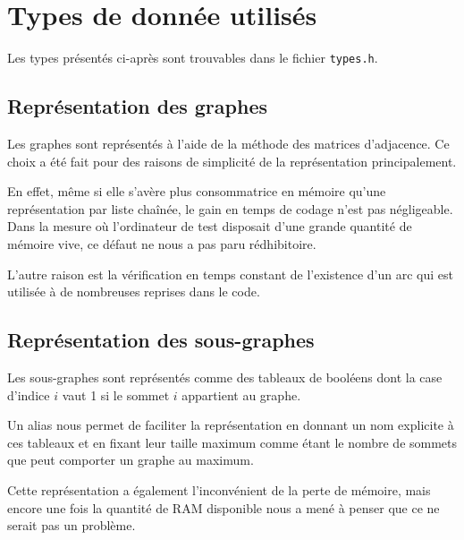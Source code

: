 \section{Types de donnée utilisés}

Les types présentés ci-après sont trouvables dans le fichier \verb|types.h|.

\subsection{Représentation des graphes}

Les graphes sont représentés à l'aide de la méthode des matrices d'adjacence. Ce choix a été fait pour des raisons de simplicité de la représentation principalement. 

En effet, même si elle s’avère  plus consommatrice en mémoire qu'une représentation par liste  chaînée, le gain en temps de codage n'est pas négligeable. Dans la mesure où l'ordinateur de test disposait d'une grande quantité de mémoire vive, ce défaut ne nous a pas paru rédhibitoire. 

L'autre raison est la vérification en temps constant de l'existence d'un arc qui est utilisée à de nombreuses reprises dans le code. 

\subsection{Représentation des sous-graphes}

Les sous-graphes sont représentés comme des tableaux de booléens dont la case d'indice $i$ vaut 1 si le sommet $i$ appartient au graphe. 

Un alias nous permet de faciliter la représentation en donnant un nom explicite à ces tableaux et en fixant leur taille maximum comme étant le nombre de sommets que peut comporter un graphe au maximum. 

Cette représentation a également l'inconvénient de la perte de mémoire, mais encore une fois la quantité de RAM disponible nous a mené à penser que ce ne serait pas un problème. 